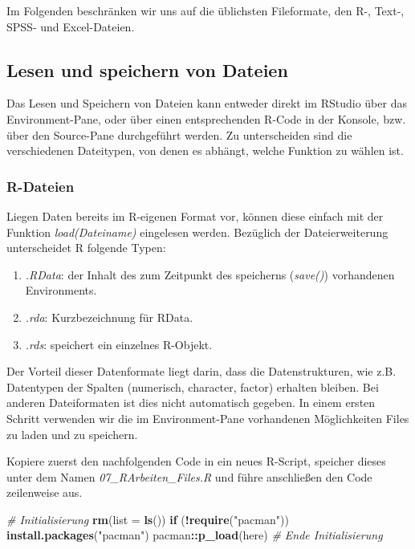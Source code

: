 \documentclass[]{article}
\newenvironment{Shaded}{\begin{snugshade}}{\end{snugshade}}
\newcommand{\KeywordTok}[1]{\textcolor[rgb]{0.13,0.29,0.53}{\textbf{#1}}}
\newcommand{\DataTypeTok}[1]{\textcolor[rgb]{0.13,0.29,0.53}{#1}}
\newcommand{\StringTok}[1]{\textcolor[rgb]{0.31,0.60,0.02}{#1}}
\newcommand{\CommentTok}[1]{\textcolor[rgb]{0.56,0.35,0.01}{\textit{#1}}}
\newcommand{\ControlFlowTok}[1]{\textcolor[rgb]{0.13,0.29,0.53}{\textbf{#1}}}
\newcommand{\OperatorTok}[1]{\textcolor[rgb]{0.81,0.36,0.00}{\textbf{#1}}}
\newcommand{\NormalTok}[1]{#1}
\providecommand{\tightlist}{%
  \setlength{\itemsep}{0pt}\setlength{\parskip}{0pt}}
\begin{document}
Im Folgenden beschränken wir uns auf die üblichsten Fileformate, den R-,
Text-, SPSS- und Excel-Dateien.

\subsection*{Lesen und speichern von
Dateien}\label{lesen-und-speichern-von-dateien}

Das Lesen und Speichern von Dateien kann entweder direkt im RStudio über
das Environment-Pane, oder über einen entsprechenden R-Code in der
Konsole, bzw. über den Source-Pane durchgeführt werden. Zu unterscheiden
sind die verschiedenen Dateitypen, von denen es abhängt, welche Funktion
zu wählen ist.

\subsubsection*{R-Dateien}\label{r-dateien}

Liegen Daten bereits im R-eigenen Format vor, können diese einfach mit
der Funktion \emph{load(Dateiname)} eingelesen werden. Bezüglich der
Dateierweiterung unterscheidet R folgende Typen:

\begin{enumerate}
\def\labelenumi{\arabic{enumi}.}
\tightlist
\item
  \emph{.RData}: der Inhalt des zum Zeitpunkt des speicherns
  (\emph{save()}) vorhandenen Environments.
\item
  \emph{.rda}: Kurzbezeichnung für RData.
\item
  \emph{.rds}: speichert ein einzelnes R-Objekt.
\end{enumerate}

Der Vorteil dieser Datenformate liegt darin, dass die Datenstrukturen,
wie z.B. Datentypen der Spalten (numerisch, character, factor) erhalten
bleiben. Bei anderen Dateiformaten ist dies nicht automatisch gegeben.
In einem ersten Schritt verwenden wir die im Environment-Pane
vorhandenen Möglichkeiten Files zu laden und zu speichern.

Kopiere zuerst den nachfolgenden Code in ein neues R-Script, speicher
dieses unter dem Namen \emph{07\_RArbeiten\_Files.R} und führe
anschließen den Code zeilenweise aus.

\begin{Shaded}
\begin{Highlighting}[]
\CommentTok{# Initialisierung}
  \KeywordTok{rm}\NormalTok{(}\DataTypeTok{list =} \KeywordTok{ls}\NormalTok{())}
  \ControlFlowTok{if}\NormalTok{ (}\OperatorTok{!}\KeywordTok{require}\NormalTok{(}\StringTok{"pacman"}\NormalTok{)) }\KeywordTok{install.packages}\NormalTok{(}\StringTok{"pacman"}\NormalTok{)}
\NormalTok{  pacman}\OperatorTok{::}\KeywordTok{p_load}\NormalTok{(here)}
  \CommentTok{# Ende Initialisierung}
\end{Highlighting}
\end{Shaded}
\end{document}
